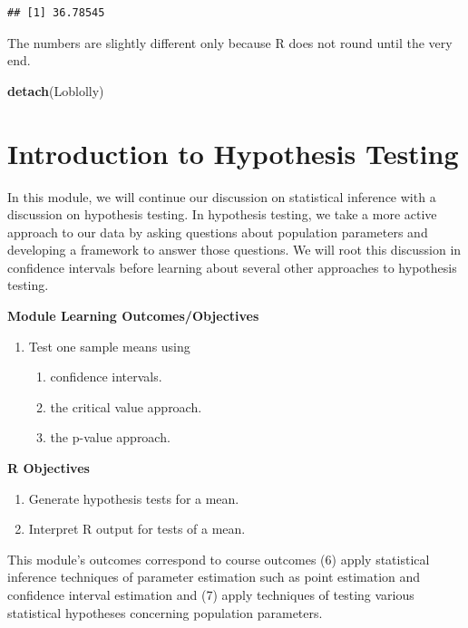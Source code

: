 \documentclass[
]{book}
\newenvironment{Shaded}{\begin{snugshade}}{\end{snugshade}}
\newcommand{\FunctionTok}[1]{\textcolor[rgb]{0.13,0.29,0.53}{\textbf{#1}}}
\newcommand{\NormalTok}[1]{#1}
\providecommand{\tightlist}{%
  \setlength{\itemsep}{0pt}\setlength{\parskip}{0pt}}
\begin{document}
\begin{verbatim}
## [1] 36.78545
\end{verbatim}

The numbers are slightly different only because R does not round until the very end.

\begin{Shaded}
\begin{Highlighting}[]
\FunctionTok{detach}\NormalTok{(Loblolly)}
\end{Highlighting}
\end{Shaded}

\chapter{Introduction to Hypothesis Testing}\label{introduction-to-hypothesis-testing}

In this module, we will continue our discussion on statistical inference with a discussion on hypothesis testing. In hypothesis testing, we take a more active approach to our data by asking questions about population parameters and developing a framework to answer those questions. We will root this discussion in confidence intervals before learning about several other approaches to hypothesis testing.

\textbf{Module Learning Outcomes/Objectives}

\begin{enumerate}
\def\labelenumi{\arabic{enumi}.}
\tightlist
\item
  Test one sample means using

  \begin{enumerate}
  \def\labelenumii{\alph{enumii}.}
  \tightlist
  \item
    confidence intervals.
  \item
    the critical value approach.
  \item
    the p-value approach.
  \end{enumerate}
\end{enumerate}

\textbf{R Objectives}

\begin{enumerate}
\def\labelenumi{\arabic{enumi}.}
\tightlist
\item
  Generate hypothesis tests for a mean.
\item
  Interpret R output for tests of a mean.
\end{enumerate}

This module's outcomes correspond to course outcomes (6) apply statistical inference techniques of parameter estimation such as point estimation and confidence interval estimation and (7) apply techniques of testing various statistical hypotheses concerning population parameters.
\end{document}
